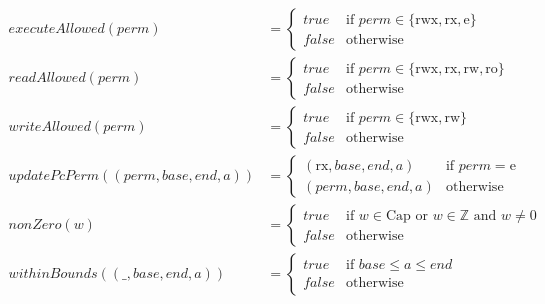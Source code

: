 \documentclass{article}
\newcommand{\false}{\mathit{false}}
\newcommand{\true}{\mathit{true}}
\newcommand{\var}[1]{\mathit{#1}}
\newcommand{\addr}{\var{a}}
\newcommand{\start}{\var{base}}
\newcommand{\addrend}{\var{end}}
\newcommand{\perm}{\var{perm}}
\newcommand{\plainfun}[1]{\mathit{#1}}
\newcommand{\updatePcPerm}[1]{\plainfun{updatePcPerm}(#1)}
\newcommand{\executeAllowed}[1]{\plainfun{executeAllowed}(#1)}
\newcommand{\nonZero}[1]{\plainfun{nonZero}(#1)}
\newcommand{\readAllowed}[1]{\plainfun{readAllowed}(#1)}
\newcommand{\writeAllowed}[1]{\plainfun{writeAllowed}(#1)}
\newcommand{\withinBounds}[1]{\plainfun{withinBounds}(#1)}
\newcommand{\plaindom}[1]{\mathrm{#1}}
\newcommand{\Caps}{\plaindom{Cap}}
\newcommand{\ints}{\mathbb{Z}}
\newcommand{\plainperm}[1]{\mathrm{#1}}
\newcommand{\readonly}{\plainperm{ro}}
\newcommand{\readwrite}{\plainperm{rw}}
\newcommand{\exec}{\plainperm{rx}}
\newcommand{\entry}{\plainperm{e}}
\newcommand{\rwx}{\plainperm{rwx}}
\begin{document}
\begin{align*}
  \executeAllowed{\perm} &=
                           \begin{cases}
                             \true & \text{if } \perm \in \{ \rwx, \exec, \entry \} \\
                             \false & \text{otherwise}
                           \end{cases} \\
  \readAllowed{\perm} &=
                           \begin{cases}
                             \true & \text{if } \perm \in \{ \rwx, \exec, \readwrite, \readonly \} \\
                             \false & \text{otherwise}
                           \end{cases} \\
  \writeAllowed{\perm} &=
                           \begin{cases}
                             \true & \text{if } \perm \in \{ \rwx, \readwrite\} \\
                             \false & \text{otherwise}
                           \end{cases} \\
  \updatePcPerm{(\perm,\start,\addrend,\addr)} &=
                                     \begin{cases}
                                       (\exec,\start,\addrend,\addr) & \text{if $\perm = \entry$}\\
                                       (\perm,\start,\addrend,\addr) & \text{otherwise} 
                                     \end{cases} \\
  \nonZero{w} &=
                \begin{cases}
                  \true & \text{if $w\in \Caps$ or $w\in \ints$ and $w \neq 0$}\\
                  \false & \text{otherwise}
                \end{cases} \\
  \withinBounds{(\_,\start,\addrend,\addr)} &=
                                              \begin{cases}
                                                \true  & \text{if $\start \leq \addr \leq \addrend$} \\
                                                \false & \text{otherwise}
                                              \end{cases} \\

\end{align*}
\end{document}
